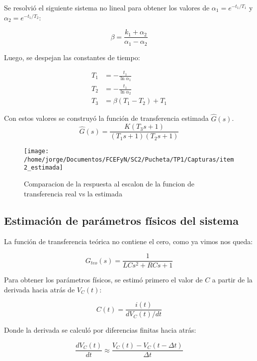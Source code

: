 \documentclass{article}
\begin{document}
Se resolvió el siguiente sistema no lineal para obtener los valores de $\alpha_1 = e^{-t_1/T_1}$ y $\alpha_2 = e^{-t_1/T_2}$:

\begin{equation}
\beta = \frac{k_1 + \alpha_2}{\alpha_1 - \alpha_2}
\end{equation}

Luego, se despejan las constantes de tiempo:

\begin{align}
T_1 &= -\frac{t_1}{\ln \alpha_1} \\
T_2 &= -\frac{t_1}{\ln \alpha_2} \\
T_3 &= \beta(T_1 - T_2) + T_1
\end{align}

Con estos valores se construyó la función de transferencia estimada $\hat{G}(s)$.
\begin{equation}
    \hat{G}(s) = \frac{K(T_3 s + 1)}{(T_1 s + 1)(T_2 s + 1)}
\end{equation}

\begin{figure}[!ht]
      \centering
        \texttt{[image: /home/jorge/Documentos/FCEFyN/SC2/Pucheta/TP1/Capturas/item2\_estimada]}
          \caption{Comparacion de la respuesta al escalon de la funcion de transferencia real vs la estimada}
            \label{fig:etiqueta2}
        \end{figure} 


\subsection*{Estimación de parámetros físicos del sistema}
La función de transferencia teórica no contiene el cero, como ya vimos nos queda:

\begin{equation}
G_{teo}(s) = \frac{1}{LC s^2 + RC s + 1}
\end{equation}

Para obtener los parámetros físicos, se estimó primero el valor de $C$ a partir de la derivada hacia atrás de $V_C(t)$:

\begin{equation}
C(t) = \frac{i(t)}{dV_C(t)/dt}
\end{equation}

Donde la derivada se calculó por diferencias finitas hacia atrás:

\begin{equation}
\frac{dV_C(t)}{dt} \approx \frac{V_C(t) - V_C(t - \Delta t)}{\Delta t}
\end{equation}
\end{document}
